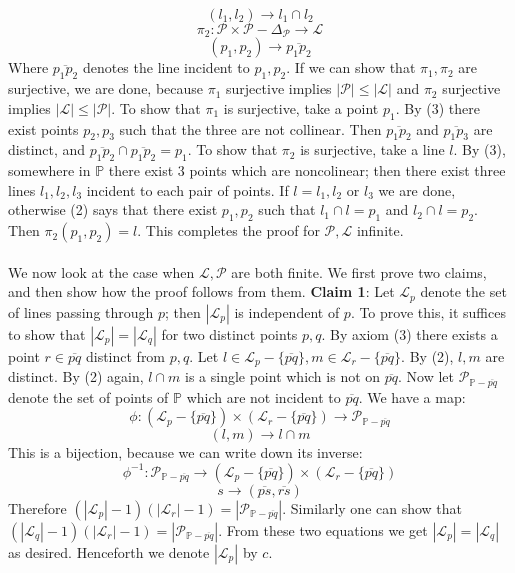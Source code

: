 \documentclass[12 pt]{article}
\begin{document}
\[      ( l_1 , l_2) \to  l_1 \cap l_2     \]
\[       \pi_2 :    \mathcal{P} \times \mathcal{P} - \Delta_{\mathcal{P}} \to \mathcal{L}  \]
\[     (p_1, p_2) \to \overline{p_1p_2}  \]
Where $\overline{p_1p_2}$ denotes the line incident to $p_1, p_2$. If we can show that $\pi_1, \pi_2$ are surjective, we are done, because $\pi_1$ surjective implies $|\mathcal{P}| \leq |\mathcal{L}|$ and $\pi_2$ surjective implies $|\mathcal{L}| \leq |\mathcal{P}|$. To show that $\pi_1$ is surjective, take a point $p_1$. By (3) there exist points $p_2, p_3$ such that the three are not collinear. Then $\overline{p_1p_2}$ and $\overline{p_1p_3}$ are distinct, and $\overline{p_1p_2} \cap \overline{p_1p_2} = p_1$. To show that $\pi_2$ is surjective, take a line $l$. By (3), somewhere in $\mathbb{P}$ there exist 3 points which are noncolinear; then there exist three lines $l_1, l_2, l_3$ incident to each pair of points. If $l = l_1, l_2$ or $l_3$ we are done, otherwise (2) says that there exist $p_1, p_2$ such that $l_1 \cap l = p_1$ and $l_2 \cap l = p_2$. Then $\pi_2 (p_1, p_2) = l$. This completes the proof for $\mathcal{P}, \mathcal{L}$ infinite.
\\
\\
We now look at the case when $\mathcal{L}, \mathcal{P}$ are both finite. We first prove two claims, and then show how the proof follows from them. \textbf{Claim 1}: Let $\mathcal{L}_p$ denote the set of lines passing through $p$; then $|\mathcal{L}_p|$ is independent of $p$. To prove this, it suffices to show that $|\mathcal{L}_p| = |\mathcal{L}_q|$ for two distinct points $p,q$. By axiom (3) there exists a point $r \in \overline{pq}$ distinct from $p,q$. Let $l \in \mathcal{L}_p - \{\overline{pq}\}, m\in \mathcal{L}_r - \{\overline{pq}\}$. By (2), $l, m$ are distinct. By (2) again, $l\cap m$ is a single point which is not on $\overline{pq}$. Now let $\mathcal{P}_{\mathbb{P} - \overline{pq}}$ denote the set of points of $\mathbb{P}$ which are not incident to $\overline{pq}$. We have a map:
\[         \phi : (\mathcal{L}_p - \{\overline{pq}\} ) \times (\mathcal{L}_r - \{\overline{pq}\} )   \to \mathcal{P}_{\mathbb{P}-\overline{pq}}      \]
\[    (l,m) \to l\cap m    \]
This is a bijection, because we can write down its inverse:
\[       \phi^{-1} :   \mathcal{P}_{\mathbb{P}-\overline{pq}} \to  (\mathcal{L}_p - \{\overline{pq}\} ) \times (\mathcal{L}_r - \{\overline{pq}\} )  \]
\[    s \to (\overline{ps}, \overline{rs} )     \]
Therefore $(|\mathcal{L}_p| - 1 )(|\mathcal{L}_r| - 1 ) = |\mathcal{P}_{\mathbb{P}-\overline{pq}}|$. Similarly one can show that $(|\mathcal{L}_q| - 1 )(|\mathcal{L}_r | - 1 ) = |\mathcal{P}_{\mathbb{P}-\overline{pq}}|$. From these two equations we get $|\mathcal{L}_p| = |\mathcal{L}_q |$ as desired. Henceforth we denote $|\mathcal{L}_p|$ by $c$.
\end{document}
